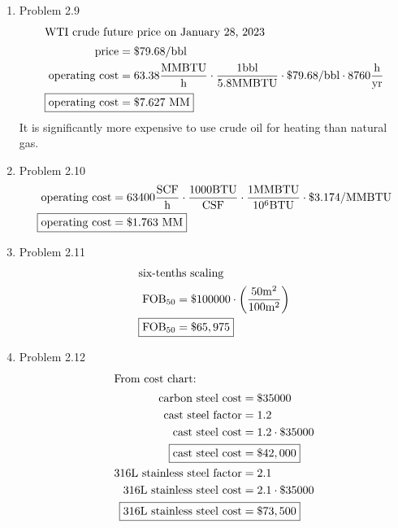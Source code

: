 \documentclass[12pt]{article}
\begin{document}
\begin{enumerate}
\newpage
    \item Problem 2.9
    \begin{align*}
        \intertext{WTI crude future price on January 28, 2023}
        \mathrm{price} &= \$ 79.68 / \mathrm{bbl} \\
        \text{operating cost} &= 63.38 \frac{\mathrm{MMBTU}}{\mathrm{h}} \cdot \frac{1 \mathrm{bbl}}{5.8\mathrm{MMBTU}} \cdot \$ 79.68 / \mathrm{bbl} \cdot 8760 \frac{\mathrm{h}}{\mathrm{yr}} \\
        \Aboxed{\text{operating cost} &= \$ 7.627 \text{ MM}}
    \end{align*}
    It is significantly more expensive to use crude oil for heating than natural gas.

\newpage
    \item Problem 2.10
    \begin{align*}
        \text{operating cost} &= 63400 \frac{\mathrm{SCF}}{\mathrm{h}} \cdot \frac{1000 \mathrm{BTU}}{\mathrm{CSF}} \cdot \frac{1 \mathrm{MMBTU}}{10^6 \mathrm{BTU}} \cdot \$ 3.174 / \mathrm{MMBTU} \\
        \Aboxed{\text{operating cost} &= \$ 1.763 \text{ MM}}
    \end{align*}

\newpage
    \item Problem 2.11
    \begin{align*}
        \intertext{six-tenths scaling}
        \mathrm{FOB}_{50} &= \$100000 \cdot \left( \frac{50\mathrm{m}^2}{100\mathrm{m}^2} \right) \\
        \Aboxed{\mathrm{FOB}_{50} &= \$ 65,975} 
    \end{align*}

\newpage
    \item Problem 2.12
    \begin{align*}
        \intertext{From cost chart:}
        \text{carbon steel cost} &= \$ 35000 \\
        \text{cast steel factor} &= 1.2 \\
        \text{cast steel cost} &= 1.2 \cdot \$ 35000 \\
        \Aboxed{\text{cast steel cost} &= \$ 42,000} \\
        \text{316L stainless steel factor} &= 2.1 \\
        \text{316L stainless steel cost} &= 2.1 \cdot \$ 35000 \\
        \Aboxed{\text{316L stainless steel cost} &= \$ 73,500} \\
    \end{align*}





\end{enumerate}
\end{document}
